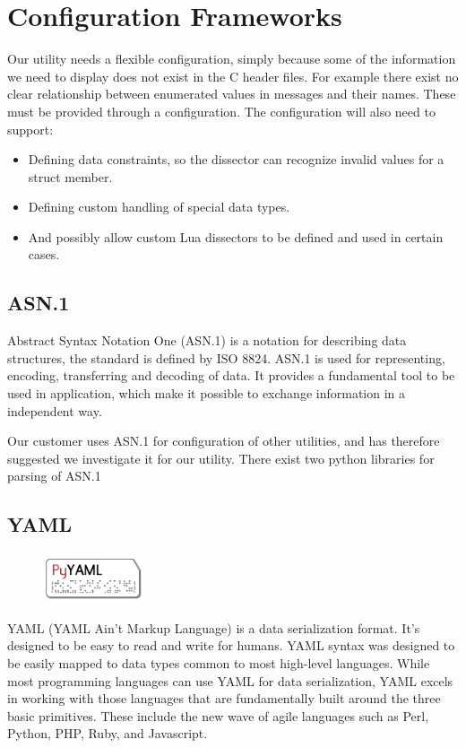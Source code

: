 \section{Configuration Frameworks}
\label{sec:pre:config}
Our utility needs a flexible configuration, simply because some of the
information we need to display does not exist in the C header files. For
example there exist no clear relationship between enumerated values in messages
and their names. These must be provided through a configuration. The
configuration will also need to support:
\begin{itemize}
	\item Defining data constraints, so the dissector can recognize invalid
		values for a struct member.
	\item Defining custom handling of special data types.
	\item  And possibly allow custom Lua dissectors to be defined and used in
		certain cases.
\end{itemize}

\subsection{ASN.1}
Abstract Syntax Notation One (ASN.1) is a notation for describing data
structures, the standard is defined by ISO 8824. ASN.1 is used for
representing, encoding, transferring and decoding of data. It provides a
fundamental tool to be used in application, which make it possible to exchange
information in a independent way.

Our customer uses ASN.1 for configuration of other utilities, and has therefore
suggested we investigate it for our utility. There exist two python libraries
for parsing of ASN.1

\subsection{YAML}
\begin{figure}
	\begin{center}
	\vspace{-30pt}
		\includegraphics[width=3cm]{./planning/img/pyyaml_logo}
	\vspace{-30pt}
	\end{center}
\end{figure}
YAML (YAML Ain't Markup Language) is a data serialization format. It's designed
to be easy to read and write for humans. YAML syntax was designed to be easily
mapped to data types common to most high-level languages. While most
programming languages can use YAML for data serialization, YAML excels in
working with those languages that are fundamentally built around the three
basic primitives. These include the new wave of agile languages such as Perl,
Python, PHP, Ruby, and Javascript.

